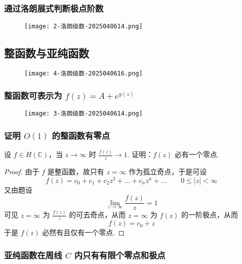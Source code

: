 \subsubsection{通过洛朗展式判断极点阶数}

\begin{figure}[H]
\centering
\texttt{[image: 2-洛朗级数-2025040614.png]}
\label{}
\end{figure}

\subsection{整函数与亚纯函数}

\begin{figure}[H]
\centering
\texttt{[image: 4-洛朗级数-2025040616.png]}
\label{}
\end{figure}

\subsubsection{整函数可表示为 \texorpdfstring{$f(z)=A+e^{ g(z) }$}{f(z)=A+e^ g(z)}}

\begin{figure}[H]
\centering
\texttt{[image: 3-洛朗级数-2025040614.png]}
\label{}
\end{figure}

\subsubsection{证明 \texorpdfstring{$O(1)$}{O(1)} 的整函数有零点}

\begin{exercise}
设 $f\in H(\mathbb{C})$，当 $z\to \infty$ 时 $\frac{f(z)}{z}\to1$. 证明：$f(z)$ 必有一个零点.
\end{exercise}
\begin{proof}
由于 $f$ 是整函数，故只有 $z=\infty$ 作为孤立奇点，于是可设
\[
f(z)=c_0+c_1+c_2z^2+\dots+c_nz^{n}+\dots \qquad 0\leq \lvert z \rvert <\infty
\]
又由题设
\[
\lim_{ z \to \infty } \frac{f(z)}{z}=1
\]
可见 $z=\infty$ 为 $\frac{f(z)}{z}$ 的可去奇点，从而 $z=\infty$ 为 $f(z)$ 的一阶极点，从而
\[
f(z)=c_0+z
\]
于是 $f(z)$ 必然有且仅有一个零点.

\end{proof}

\subsubsection{亚纯函数在周线 \texorpdfstring{$C$}{C} 内只有有限个零点和极点}

